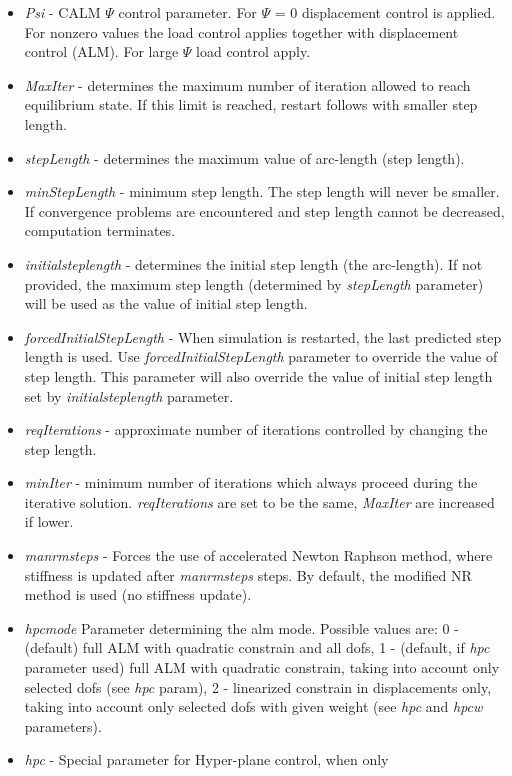 \documentclass[a4paper]{article}
\newcommand{\param}[1]{{\em #1}}
\begin{document}
\begin{itemize}
\item \param{Psi} - CALM $\Psi$ control parameter. For $\Psi$ = 0
displacement control is applied. For nonzero values the load control
applies together with displacement control (ALM). For large $\Psi$
load control apply.
\item \param{MaxIter} - determines the maximum number of iteration allowed to
reach equilibrium state. If this limit is reached, restart follows
with smaller step length.
\item \param{stepLength} - determines the maximum value of arc-length (step length).
\item \param{min\-Step\-Le\-ngth} - minimum step length. The step length will never be
smaller. If convergence problems are encountered and step length cannot
be decreased, computation terminates.
\item \param{initialsteplength} - determines the initial step length (the arc-length). If not provided, the maximum step length (determined by \param{stepLength} parameter) will be used as the value of initial step length. 
\item \param{forcedInitialStepLength} - When simulation is restarted, the last predicted step length is used. Use \param{forcedInitialStepLength} parameter to override the value of step length. This parameter will also override the value of initial step length set by \param{initialsteplength} parameter.
\item \param{reqIterations} - approximate number of iterations controlled by changing the step length.
\item \param{minIter} - minimum number of iterations which always proceed during the iterative solution. \param{reqIterations} are set to be the same, \param{MaxIter} are increased if lower.
\item \param{manrmsteps} - Forces the use of accelerated
Newton Raphson met\-hod, where stiffness is updated after
\param{manrmsteps} steps. By default, the modified NR
method is used (no stiffness update).
\item \param{hpcmode} Parameter determining the alm mode.
Possible values are: 0 - (default) full ALM with quadratic constrain and
all dofs, 1 - (default, if \param{hpc} parameter used) full ALM with quadratic constrain, taking into account
only selected dofs (see \param{hpc} param), 2 - linearized constrain
in displacements only, taking into account only selected dofs with
given weight (see \param{hpc} and \param{hpcw} parameters).
\item \param{hpc} - Special parameter for Hyper-plane control, when only

\end{itemize}
\end{document}
